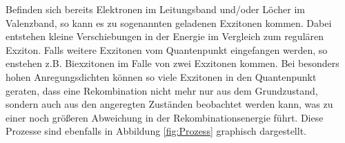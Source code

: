       Befinden sich bereits Elektronen im Leitungsband und/oder Löcher im Valenzband, so kann es zu sogenannten geladenen Exzitonen kommen. Dabei entstehen kleine Verschiebungen in der Energie im Vergleich zum regulären Exziton.
      Falls weitere Exzitonen vom Quantenpunkt eingefangen werden, so enstehen z.B. Biexzitonen im Falle von zwei Exzitonen kommen. Bei besonders hohen Anregungsdichten können so viele Exzitonen in den Quantenpunkt geraten, dass eine Rekombination nicht mehr nur aus dem Grundzustand, sondern auch aus den angeregten Zuständen beobachtet werden kann, was zu einer noch größeren Abweichung in der Rekombinationsenergie führt. Diese Prozesse sind ebenfalls in Abbildung \ref{fig:Prozess} graphisch dargestellt.